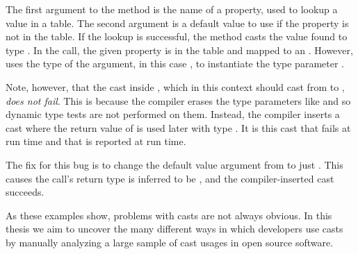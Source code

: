 The first argument to the method is the name of a property,
used to lookup a value in a table.
The second argument is a default value to use if the property is not in the table.
If the lookup is successful,
the method casts the value found to type .
In the call, the given property
 is in the table and mapped to an .
However, \java{} uses the type of the  argument, in this
case , to instantiate the type parameter .

Note, however, that the cast inside , which in this context
should cast from  to , \emph{does not fail}.
This is because the \java{} compiler erases the type
parameters like  and so dynamic type tests are not performed on them.
Instead, the compiler inserts a cast where the return value
of  is used later with type .
It is this cast that fails at run time and that is reported at run time.

The fix for this bug is to change the default value argument from 
to just .
This causes the call's return type is inferred to be
, and the compiler-inserted cast succeeds.

As these examples show, problems with casts are not always obvious.
In this thesis we aim to uncover the many different ways in which developers use casts
by manually analyzing a large sample of cast usages in open source software.